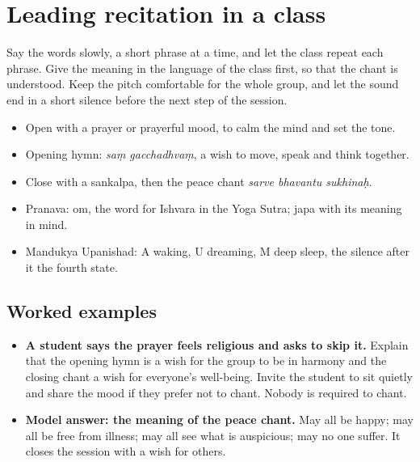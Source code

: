 \section{Leading recitation in a class}

Say the words slowly, a short phrase at a time, and let the class repeat each phrase. Give the meaning in the language of the class first, so that the chant is understood. Keep the pitch comfortable for the whole group, and let the sound end in a short silence before the next step of the session.


\begin{recall}
\begin{itemize}
\item Open with a prayer or prayerful mood, to calm the mind and set the tone.
\item Opening hymn: \emph{saṃ gacchadhvaṃ}, a wish to move, speak and think together.
\item Close with a sankalpa, then the peace chant \emph{sarve bhavantu sukhinaḥ}.
\item Pranava: om, the word for Ishvara in the Yoga Sutra; japa with its meaning in mind.
\item Mandukya Upanishad: A waking, U dreaming, M deep sleep, the silence after it the fourth state.
\end{itemize}
\end{recall}

\subsection*{Worked examples}
\begin{itemize}
\item \textbf{A student says the prayer feels religious and asks to skip it.} Explain that the opening hymn is a wish for the group to be in harmony and the closing chant a wish for everyone's well-being. Invite the student to sit quietly and share the mood if they prefer not to chant. Nobody is required to chant.
\item \textbf{Model answer: the meaning of the peace chant.} May all be happy; may all be free from illness; may all see what is auspicious; may no one suffer. It closes the session with a wish for others.
\end{itemize}

